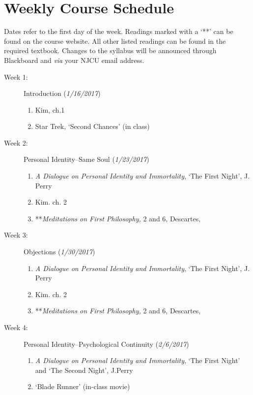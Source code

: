 \documentclass[article,oneside]{memoir}
\begin{document}
\section{Weekly Course Schedule}
Dates refer to the first day of the week. Readings marked with a `**' can be found on the course website. All other listed readings can be found in the required textbook. Changes to the syllabus will be announced through Blackboard and \emph{via} your NJCU email address. \newline





\begin{description}

\item[Week 1: ] Introduction (\emph{1/16/2017})
\begin{enumerate}
\item Kim, ch.1
\item Star Trek, `Second Chances' (in class)  
\end{enumerate}

\item[Week 2:]  Personal Identity--Same Soul (\emph{1/23/2017})
\begin{enumerate}
\item \emph{A Dialogue on Personal Identity and Immortality}, `The First Night', J. Perry  
\item Kim. ch. 2
\item**\emph{Meditations on First Philosophy,} 2 and 6,  Descartes, 
\end{enumerate}


\item[Week 3:]  Objections (\emph{1/30/2017})
\begin{enumerate}
\item  \emph{A Dialogue on Personal Identity and Immortality}, `The First Night', J. Perry
\item Kim. ch. 2
\item**\emph{Meditations on First Philosophy,} 2 and 6, Descartes, 
\end{enumerate}


\item[Week 4: ] Personal Identity--Psychological Continuity (\emph{2/6/2017})
\begin{enumerate}
\item \emph{A Dialogue on Personal Identity and Immortality}, `The First Night' and `The Second Night', J.Perry
\item `Blade Runner' (in-class movie)
\end{enumerate}


\end{description}
\end{document}
